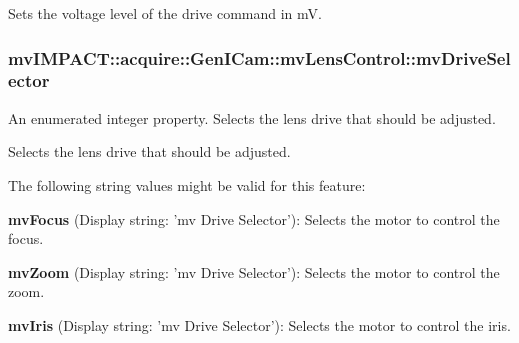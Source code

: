Sets the voltage level of the drive command in m\+V. \hypertarget{classmv_i_m_p_a_c_t_1_1acquire_1_1_gen_i_cam_1_1mv_lens_control_abeff1f248c0200b0055f09b9c52f6eb8}{
\subsubsection[{mv\+Drive\+Selector}]{ mv\+I\+M\+P\+A\+C\+T\+::acquire\+::\+Gen\+I\+Cam\+::mv\+Lens\+Control\+::mv\+Drive\+Selector}}\label{classmv_i_m_p_a_c_t_1_1acquire_1_1_gen_i_cam_1_1mv_lens_control_abeff1f248c0200b0055f09b9c52f6eb8}


An enumerated integer property. Selects the lens drive that should be adjusted. 

Selects the lens drive that should be adjusted.

The following string values might be valid for this feature\+:
\begin{DoxyItemize}
\item {\bfseries mv\+Focus} (Display string\+: 'mv Drive Selector')\+: Selects the motor to control the focus.
\item {\bfseries mv\+Zoom} (Display string\+: 'mv Drive Selector')\+: Selects the motor to control the zoom.
\item {\bfseries mv\+Iris} (Display string\+: 'mv Drive Selector')\+: Selects the motor to control the iris.
\end{DoxyItemize}

